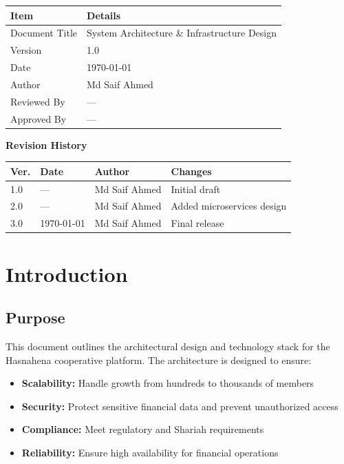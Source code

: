 \documentclass[11pt,a4paper]{article}
\newcommand{\DocumentTitle}{System Architecture \& Infrastructure Design}
\newcommand{\DocumentVersion}{1.0}
\newcommand{\DocumentDate}{\today}
\begin{document}
\begin{tabular}{@{}p{3cm}p{10cm}@{}}
\toprule
\textbf{Item} & \textbf{Details} \\
\midrule
Document Title & \DocumentTitle \\
Version & \DocumentVersion \\
Date & \DocumentDate \\
Author & Md Saif Ahmed \\
Reviewed By & --- \\
Approved By & --- \\
\bottomrule
\end{tabular}

\vspace{1em}

\textbf{Revision History}

\begin{tabular}{@{}p{1.2cm}p{2.5cm}p{3.5cm}p{5.5cm}@{}}
\toprule
\textbf{Ver.} & \textbf{Date} & \textbf{Author} & \textbf{Changes} \\
\midrule
1.0 & --- & Md Saif Ahmed & Initial draft \\
2.0 & --- & Md Saif Ahmed & Added microservices design \\
3.0 & \DocumentDate & Md Saif Ahmed & Final release \\
\bottomrule
\end{tabular}

\newpage

\section{Introduction}

\subsection{Purpose}
This document outlines the architectural design and technology stack for the Hasnahena cooperative platform. The architecture is designed to ensure:
\begin{itemize}
    \item \textbf{Scalability:} Handle growth from hundreds to thousands of members
    \item \textbf{Security:} Protect sensitive financial data and prevent unauthorized access
    \item \textbf{Compliance:} Meet regulatory and Shariah requirements
    \item \textbf{Reliability:} Ensure high availability for financial operations
\end{itemize}
\end{document}
